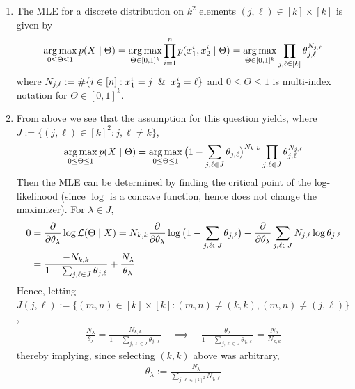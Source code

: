 \documentclass{article}
\begin{document}
\begin{enumerate}
\item The MLE for a discrete distribution on $k^2$ elements
  $(j,\ell) \in [k]\times [k]$ is given by
  \begin{align*}
    \mathop{\rm arg\,max}_{0\leq \Theta \leq 1} p(X \mid \Theta) = \mathop{\rm arg\,max}_{\Theta\in [0,1]^k}
    \prod_{i=1}^n p(x^i_1, x^i_2 \mid \Theta) = \mathop{\rm arg\,max}_{\Theta \in [0,1]^k}
    \prod_{j,\ell \in [k]} \theta_{j,\ell}^{N_{j,\ell}}
  \end{align*}
  where $N_{j,\ell} := \#\{ i \in [n] : x^i_1 = j \And x^i_2 = \ell \}$ and
  $0 \leq \Theta \leq 1$ is multi-index notation for
  $\Theta \in [0,1]^k$.

\item From above we see that the assumption for this question yields, where $J
  := \{ (j,\ell) \in [k]^2 : j, \ell \neq k\}$,
  \begin{align*}
    \mathop{\rm arg\,max}_{0 \leq \Theta \leq 1} p(X \mid \Theta) = \mathop{\rm arg\,max}_{0 \leq \Theta
    \leq 1} \big( 1 - \sum_{j, \ell \in J} \theta_{j, \ell} \big)^{N_{k,k}} \prod_{j,\ell \in J} \theta_{j, \ell}^{N_{j,\ell}}
  \end{align*}
  Then the MLE can be determined by finding the critical point of the
  log-likelihood (since $\log$ is a concave function, hence does not change the
  maximizer). For $\lambda \in J$,
  \begin{align*}
    0 &= \frac{\partial}{\partial\theta_\lambda} \log \mathcal{L}(\Theta \mid X) =
        N_{k,k}\frac{\partial}{\partial\theta_\lambda} \log\big(1 -
        \sum_{j,\ell \in J} \theta_{j,\ell}\big)
        + \frac{\partial}{\partial\theta_\lambda} \sum_{j,\ell \in J} N_{j, \ell} \log \theta_{j, \ell}
    \\
      &= \frac{-N_{k,k}}{1 - \sum_{j,\ell \in J}\theta_{j,\ell}} +
        \frac{N_\lambda}{\theta_\lambda}
  \end{align*}
  Hence, letting
  $J(j,\ell) := \{(m,n) \in [k]\times [k] : (m,n) \neq (k,k), (m,n) \neq
  (j,\ell)\}$,
  \begin{align*}
    \frac{N_\lambda}{\theta_\lambda} = \frac{N_{k,k}}{1 - \sum_{j,\ell \in J}
    \theta_{j,\ell}} \quad \implies \quad \frac{\theta_\lambda}{1 -\sum_{j,\ell
    \in J} \theta_{j,\ell}} = \frac{N_\lambda}{N_{k,k}}
  \end{align*}
  thereby implying, since selecting $(k,k)$ above was arbitrary,
  \begin{align*}
    \theta_\lambda := \frac{N_\lambda}{\sum_{j,\ell \in [k]^2} N_{j,\ell}}
  \end{align*}


\end{enumerate}
\end{document}
